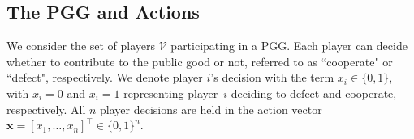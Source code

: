 \documentclass[letterpaper, 10 pt, conference]{ieeeconf}  %
\newcommand{\vect}[1]{\boldsymbol{#1}}
\newtheorem{definition}{Definition}
\begin{document}

\subsection{The PGG and Actions}


We consider the set of players $\mathcal V$ participating in a PGG. Each player can decide whether to contribute to the public good or not, referred to as ``cooperate" or ``defect", respectively. We denote player $i$'s decision with the term $x_i \in \{0,1\}$, with $x_i=0$ and $x_i=1$ representing player~$i$ deciding to defect and cooperate, respectively. All $n$ player decisions are held in the action vector $\vect{x}=[x_1, \dots, x_n]^\top \in \{0,1\}^n$. 
\end{document}
